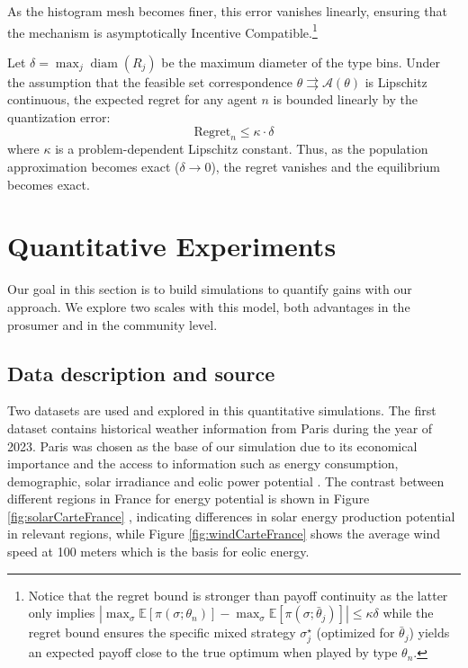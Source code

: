 \documentclass[12pt, notitlepage]{article}
\begin{document}
As the histogram mesh becomes finer, this error vanishes linearly, ensuring that the mechanism is asymptotically Incentive Compatible.\footnote{Notice that the regret bound is stronger than payoff continuity as the latter only implies $|\max_{\sigma} \mathbb{E}[\pi(\sigma;\theta_n)] - \max_{\sigma} \mathbb{E}[\pi(\sigma;\bar{\theta}_j)]| \le \kappa \delta$ while the regret bound ensures the specific mixed strategy $\sigma_j^\star$ (optimized for $\bar{\theta}_j$) yields an expected payoff close to the true optimum when played by type $\theta_n$.}

\begin{proposition} \label{prop:vanishing-regret}
Let $\delta = \max_{j} \operatorname{diam}(R_j)$ be the maximum diameter of the type bins. Under the assumption that the feasible set correspondence $\theta \rightrightarrows \mathcal{A}(\theta)$ is Lipschitz continuous, the expected regret for any agent $n$ is bounded linearly by the quantization error:
\[
\text{Regret}_n  \le \kappa \cdot \delta
\]
where $\kappa$ is a problem-dependent Lipschitz constant. Thus, as the population approximation becomes exact ($\delta \to 0$), the regret vanishes and the equilibrium becomes exact.
\end{proposition}

\section{Quantitative Experiments}
\label{quantitative}

Our goal in this section is to build simulations to quantify gains with our approach. We explore two scales with this model, both advantages in the prosumer and in the community level. 


\subsection{Data description and source}

Two datasets are used and explored in this quantitative simulations. The first dataset contains historical weather information from Paris during the year of 2023. Paris was chosen as the base of our simulation due to its economical importance and the access to information such as energy consumption, demographic, solar irradiance and eolic power potential \cite{hakkarainen2015role}. The contrast between different regions in France for energy potential is shown in Figure \ref{fig:solarCarteFrance} \cite{solargris}, indicating differences in solar energy production potential in relevant regions, while Figure \ref{fig:windCarteFrance} shows the average wind speed at 100 meters which is the basis for eolic energy. 
\end{document}
